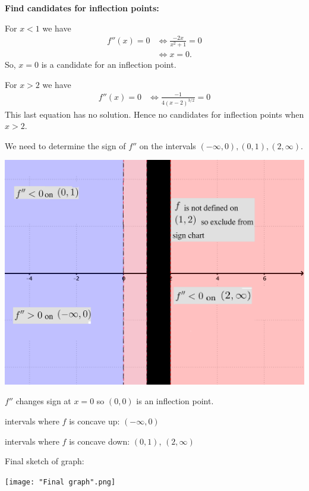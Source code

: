 \documentclass[nooutcomes,handout]{ximera}
\begin{document}
\begin{problem}
\begin{enumerate}
\begin{freeResponse}
        \textbf{Find candidates for inflection points:}

        For $x < 1$ we have
        \begin{align*}
          f''(x) = 0 &\iff \frac{-2x}{x^2+1} = 0\\
          &\iff x = 0.
        \end{align*}
        So, $x=0$ is a candidate for an inflection point. 

        For $x > 2$ we have
        \begin{align*}
          f''(x) = 0 &\iff \frac{-1}{4(x-2)^{3/2}} = 0
        \end{align*}
        This last equation has no solution.
        Hence no candidates for inflection points when $x >2$.

        We need to determine the sign of $f''$ on the intervals $(-\infty,0), (0,1), (2,\infty)$.
        \begin{image}
          \includegraphics[scale = 0.3]{figure11.png}
        \end{image}
        
        

       $f''$ changes sign at $x=0$ so $(0,0)$ is an inflection point.

        intervals where $f$ is concave up: $(-\infty, 0)$

        intervals where $f$ is concave down: $(0,1)$, $(2, \infty)$

        Final sketch of graph:
        \begin{image}
          \texttt{[image: "Final graph".png]}
        \end{image}
      \end{freeResponse}
        
        
    \end{enumerate}
\end{problem}
\end{document}
